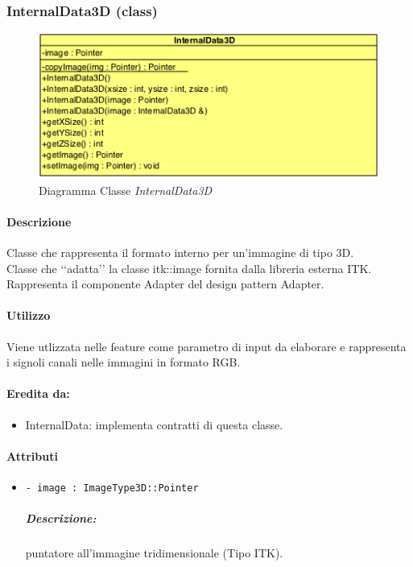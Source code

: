 \subsubsection{InternalData3D (class)}
\label{InternalData3D}
\begin{figure}[!h]
\centering
			\includegraphics[scale=1]{./Content/Immagini/modelCore/InternalData3D.png}
			\caption{Diagramma Classe \textsl{InternalData3D}}
			\label{InternalData3D_img}
\end{figure}

\paragraph{Descrizione \\}
Classe che rappresenta il formato interno per un'immagine di tipo 3D.
\\Classe che \lq\lq{}adatta\rq\rq{} la classe itk::image fornita dalla libreria esterna ITK\g{}.
\\Rappresenta il componente Adapter del design pattern\g{} Adapter.

\paragraph{Utilizzo \\}
Viene utlizzata nelle feature\g{} come parametro di input da elaborare e rappresenta i signoli canali nelle immagini in formato RGB.

\paragraph{Eredita da:}
\begin{itemize}
	\item InternalData: implementa contratti di questa classe.
\end{itemize}

\paragraph{Attributi \\}
	\begin{itemize}
		\item \color{teal}\verb!- image : ImageType3D::Pointer !
		\color{black}
		\subparagraph{Descrizione:} puntatore all'immagine tridimensionale (Tipo ITK\g{}).
	\end{itemize}
	

